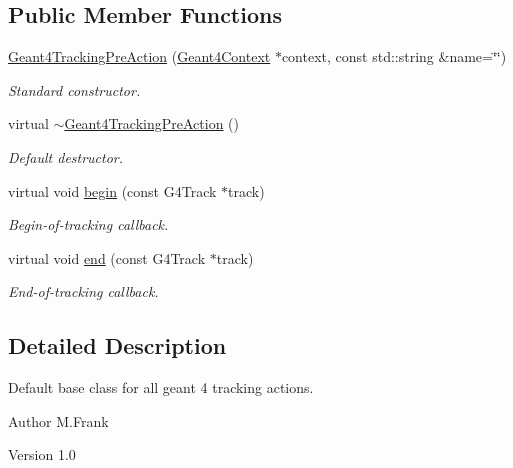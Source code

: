 \subsection*{Public Member Functions}
\begin{DoxyCompactItemize}
\item 
\hyperlink{class_d_d4hep_1_1_simulation_1_1_geant4_tracking_pre_action_a7727fa75c8c1ee2a81b105d4e8aa29a5}{Geant4TrackingPreAction} (\hyperlink{class_d_d4hep_1_1_simulation_1_1_geant4_context}{Geant4Context} $\ast$context, const std::string \&name=\char`\"{}\char`\"{})
\begin{DoxyCompactList}\small\item\em Standard constructor. \item\end{DoxyCompactList}\item 
virtual \hyperlink{class_d_d4hep_1_1_simulation_1_1_geant4_tracking_pre_action_a47e7a397ae402a4f4d7ec9cfdb0bb143}{$\sim$Geant4TrackingPreAction} ()
\begin{DoxyCompactList}\small\item\em Default destructor. \item\end{DoxyCompactList}\item 
virtual void \hyperlink{class_d_d4hep_1_1_simulation_1_1_geant4_tracking_pre_action_a1a4535994e5225ef10c47164a21deb92}{begin} (const G4Track $\ast$track)
\begin{DoxyCompactList}\small\item\em Begin-\/of-\/tracking callback. \item\end{DoxyCompactList}\item 
virtual void \hyperlink{class_d_d4hep_1_1_simulation_1_1_geant4_tracking_pre_action_a372b3efd2f2ac8f2c75bb435fd286ac3}{end} (const G4Track $\ast$track)
\begin{DoxyCompactList}\small\item\em End-\/of-\/tracking callback. \item\end{DoxyCompactList}\end{DoxyCompactItemize}


\subsection{Detailed Description}
Default base class for all geant 4 tracking actions. \begin{DoxyAuthor}{Author}
M.Frank 
\end{DoxyAuthor}
\begin{DoxyVersion}{Version}
1.0 
\end{DoxyVersion}


